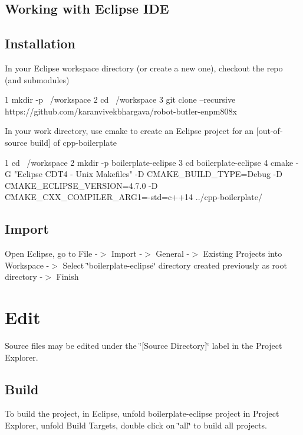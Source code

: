 \subsection*{Working with Eclipse I\+DE}

\subsection*{Installation}

In your Eclipse workspace directory (or create a new one), checkout the repo (and submodules) 
\begin{DoxyCode}
1 mkdir -p ~/workspace
2 cd ~/workspace
3 git clone --recursive https://github.com/karanvivekbhargava/robot-butler-enpm808x
\end{DoxyCode}


In your work directory, use cmake to create an Eclipse project for an \mbox{[}out-\/of-\/source build\mbox{]} of cpp-\/boilerplate


\begin{DoxyCode}
1 cd ~/workspace
2 mkdir -p boilerplate-eclipse
3 cd boilerplate-eclipse
4 cmake -G "Eclipse CDT4 - Unix Makefiles" -D CMAKE\_BUILD\_TYPE=Debug -D CMAKE\_ECLIPSE\_VERSION=4.7.0 -D
       CMAKE\_CXX\_COMPILER\_ARG1=-std=c++14 ../cpp-boilerplate/
\end{DoxyCode}


\subsection*{Import}

Open Eclipse, go to File -\/$>$ Import -\/$>$ General -\/$>$ Existing Projects into Workspace -\/$>$ Select \char`\"{}boilerplate-\/eclipse\char`\"{} directory created previously as root directory -\/$>$ Finish

\section*{Edit}

Source files may be edited under the \char`\"{}\mbox{[}\+Source Directory\mbox{]}\char`\"{} label in the Project Explorer.

\subsection*{Build}

To build the project, in Eclipse, unfold boilerplate-\/eclipse project in Project Explorer, unfold Build Targets, double click on \char`\"{}all\char`\"{} to build all projects.

